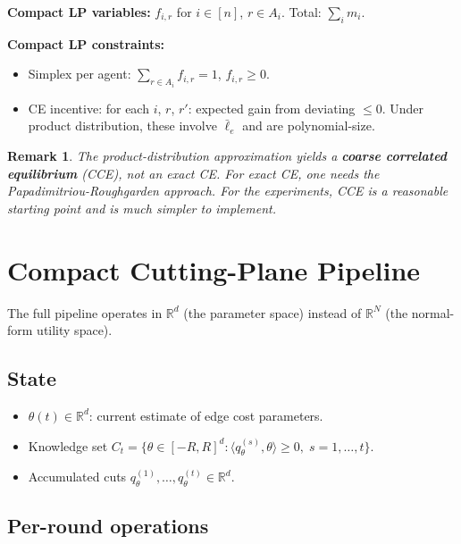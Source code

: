 \documentclass[11pt]{article}
\newcommand{\R}{\mathbb{R}}
\newtheorem{remark}{Remark}
\begin{document}
\textbf{Compact LP variables:} $f_{i,r}$ for $i \in [n]$, $r \in A_i$. Total: $\sum_i m_i$.

\textbf{Compact LP constraints:}
\begin{itemize}[nosep]
    \item Simplex per agent: $\sum_{r \in A_i} f_{i,r} = 1$, $f_{i,r} \geq 0$.
    \item CE incentive: for each $i$, $r$, $r'$: expected gain from deviating $\leq 0$. Under product distribution, these involve $\bar{\ell}_e$ and are polynomial-size.
\end{itemize}

\begin{remark}
The product-distribution approximation yields a \textbf{coarse correlated equilibrium} (CCE), not an exact CE. For exact CE, one needs the Papadimitriou-Roughgarden approach. For the experiments, CCE is a reasonable starting point and is much simpler to implement.
\end{remark}

\section{Compact Cutting-Plane Pipeline}

The full pipeline operates in $\R^d$ (the parameter space) instead of $\R^N$ (the normal-form utility space).

\subsection{State}

\begin{itemize}[nosep]
    \item $\theta(t) \in \R^d$: current estimate of edge cost parameters.
    \item Knowledge set $C_t = \{\theta \in [-R, R]^d : \langle q_\theta^{(s)}, \theta \rangle \geq 0,\; s = 1, \ldots, t\}$.
    \item Accumulated cuts $q_\theta^{(1)}, \ldots, q_\theta^{(t)} \in \R^d$.
\end{itemize}

\subsection{Per-round operations}
\end{document}
